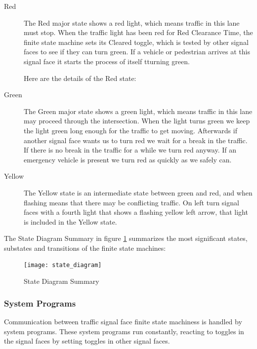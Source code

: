 \documentclass[letterpaper,twoside]{article}
\begin{document}
\begin{description}

\item[Red]  
The Red major state shows a red light, which means traffic in this
lane must stop.  When the traffic light has been red for Red Clearance Time,
the finite state machine sets its Cleared toggle, which is tested by other
signal faces to see if they can turn green.  If a vehicle or
pedestrian arrives at this signal face it starts the process
of itself tturning green.

Here are the details of the Red state:
      


\item[Green]
The Green major state shows a green light, which means traffic in this lane
may proceed through the intersection.  When the light turns green
we keep the light green long enough
for the traffic to get moving.  Afterwards if another signal face wants us
to turn red we wait for a break in the traffic.  If there is no break in the
traffic for a while we turn red anyway.  If an emergency vehicle is present
we turn red as quickly as we safely can.



\item[Yellow]
The Yellow state is an intermediate state between green and red, and when
flashing means that there may be conflicting traffic.  On left turn signal
faces with a fourth light that shows a flashing yellow left arrow, that
light is included in the Yellow state.



\end{description}

The State Diagram Summary in figure \ref{fig:State_Diagram_Summary}
summarizes the most significant states, substates and
transitions of the finite state machines:

\begin{figure}[htb]
  {\texttt{[image: state\_diagram]}}
  {\caption{State Diagram Summary}\label{fig:State_Diagram_Summary}}
\end{figure}

\subsubsection{System Programs}

Communication between traffic signal face finite state machiness is handled by
system programs.
These system programs run constantly, reacting to toggles in the
signal faces by setting toggles in other signal faces.
\end{document}
